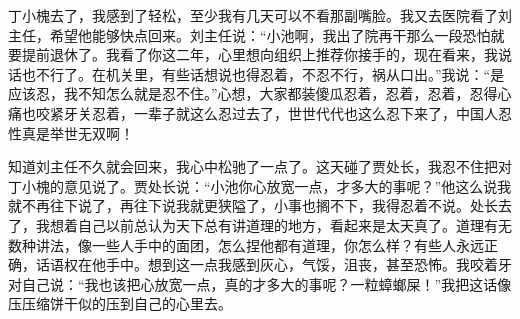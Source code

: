 \documentclass[12pt,oneside]{book}
\begin{document}
丁小槐去了，我感到了轻松，至少我有几天可以不看那副嘴脸。我又去医院看了刘主任，希望他能够快点回来。刘主任说：``小池啊，我出了院再干那么一段恐怕就要提前退休了。我看了你这二年，心里想向组织上推荐你接手的，现在看来，我说话也不行了。在机关里，有些话想说也得忍着，不忍不行，祸从口出。''我说：``是应该忍，我不知怎么就是忍不住。''心想，大家都装傻瓜忍着，忍着，忍着，忍得心痛也咬紧牙关忍着，一辈子就这么忍过去了，世世代代也这么忍下来了，中国人忍性真是举世无双啊！

知道刘主任不久就会回来，我心中松驰了一点了。这天碰了贾处长，我忍不住把对丁小槐的意见说了。贾处长说：``小池你心放宽一点，才多大的事呢？''他这么说我就不再往下说了，再往下说我就更狭隘了，小事也搁不下，我得忍着不说。处长去了，我想着自己以前总认为天下总有讲道理的地方，看起来是太天真了。道理有无数种讲法，像一些人手中的面团，怎么捏他都有道理，你怎么样？有些人永远正确，话语权在他手中。想到这一点我感到灰心，气馁，沮丧，甚至恐怖。我咬着牙对自己说：``我也该把心放宽一点，真的才多大的事呢？一粒蟑螂屎！''我把这话像压压缩饼干似的压到自己的心里去。
\end{document}
